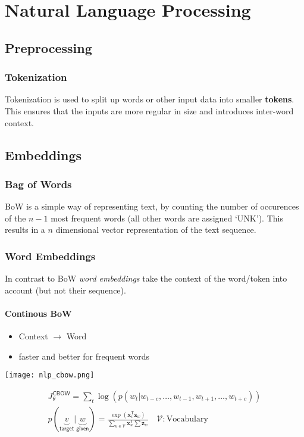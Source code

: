 \section{Natural Language Processing}
\subsection{Preprocessing}
\subsubsection{Tokenization}
Tokenization is used to split up words or other input data into smaller \textbf{tokens}. This ensures that the inputs are more regular in size and introduces inter-word context.

\subsection{Embeddings}

\subsubsection{Bag of Words}
BoW is a simple way of representing text, by counting the number of occurences of the $n-1$ most frequent words (all other words are assigned `UNK').
This results in a $n$ dimensional vector representation of the text sequence.
\subsubsection{Word Embeddings}
In contrast to BoW \textit{word embeddings} take the context of the word/token into account (but not their sequence).


\paragraph{Continous BoW}
\begin{itemize}
    \item Context $\to$ Word
    \item faster and better for frequent words
\end{itemize}

\begin{center}
    \texttt{[image: nlp\_cbow.png]}
\end{center}
\noindent\begin{gather*}
    J_\theta^{\mathsf{CBOW}}                                               = \sum_{t}\log\left(p(w_t|w_{t-c},\ldots, w_{t-1},w_{t+1},\ldots, w_{t+c})\right)                                   \\
    p(\underbrace{v}_{\textsf{target}} | \underbrace{w}_{\textsf{given}})  = \frac{\exp(\mathbf{x}_v^{\mathsf{T}}\mathbf{z}_w)}{\sum\limits_{u\in \mathcal{V}} \mathbf{x}_u^{\mathsf{T}}\sum\mathbf{z}_w} \quad \mathcal{V}: \text{Vocabulary}
\end{gather*}

